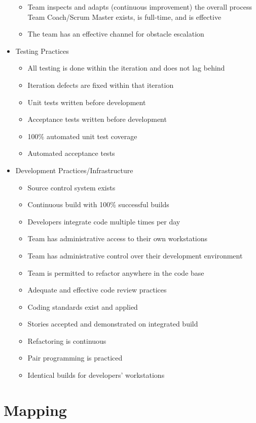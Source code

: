 \begin{appendices}
\begin{itemize}
\begin{itemize}
			\item Team inspects and adapts (continuous improvement) the overall process
			\removed Team Coach/Scrum Master exists, is full-time, and is effective
			\item The team has an effective channel for obstacle escalation
		\end{itemize}
	\item Testing Practices
		\begin{itemize}
			\item All testing is done within the iteration and does not lag behind
			\item Iteration defects are fixed within that iteration
			\item Unit tests written before development
			\item Acceptance tests written before development
			\item 100\% automated unit test coverage
			\item Automated acceptance tests
		\end{itemize}
	\item Development Practices/Infrastructure
		\begin{itemize}
			\item Source control system exists
			\item Continuous build with 100\% successful builds
			\item Developers integrate code multiple times per day
			\item Team has administrative access to their own workstations
			\item Team has administrative control over their development environment
			\item Team is permitted to refactor anywhere in the code base
			\item Adequate and effective code review practices
			\item Coding standards exist and applied
			\item Stories accepted and demonstrated on integrated build
			\item Refactoring is continuous
			\item Pair programming is practiced
			\item Identical builds for developers' workstations
		\end{itemize}
\end{itemize}





\chapter{Mapping}
\label{sec:mapping}


\end{appendices}
